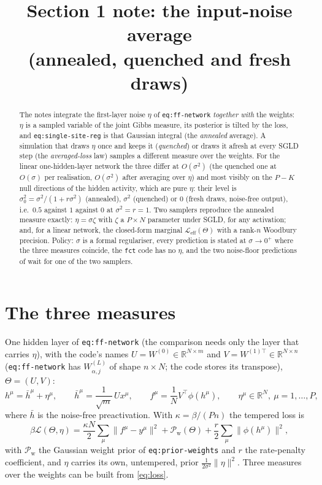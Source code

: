 \documentclass[11pt,a4paper]{article}
\title{Section 1 note: the input-noise average\\(annealed, quenched and fresh draws)}
\author{}
\date{}
\newcommand{\R}{\mathbb R}
\newcommand{\Lc}{\mathcal L}
\newcommand{\Leff}{\mathcal L_{\mathrm{eff}}}
\newcommand{\Pw}{\mathcal P_{\mathrm w}}
\newcommand{\hb}{\bar h}
\theoremstyle{remark}
\begin{document}
\maketitle

\begin{abstract}
The notes integrate the first-layer noise $\eta$ of \texttt{eq:ff-network}
\emph{together with} the weights: $\eta$ is a sampled variable of the joint
Gibbs measure, its posterior is tilted by the loss, and
\texttt{eq:single-site-reg} is that Gaussian integral (the \emph{annealed}
average). A simulation that draws $\eta$ once and keeps it (\emph{quenched}) or
draws it afresh at every SGLD step (the \emph{averaged-loss} law) samples a
different measure over the weights. For the linear one-hidden-layer network
the three differ at $O(\sigma^2)$ (the quenched one at $O(\sigma)$ per
realisation, $O(\sigma^2)$ after averaging over $\eta$) and most visibly on the $P-K$ null
directions of the hidden activity, which are pure $\eta$: their level is
$\sigma_0^2 = \sigma^2/(1+r\sigma^2)$ (annealed), $\sigma^2$ (quenched) or $0$
(fresh draws, noise-free output), i.e.\ $0.5$ against $1$ against $0$ at
$\sigma^2 = r = 1$. Two samplers reproduce the annealed measure exactly:
$\eta = \sigma\zeta$ with $\zeta$ a $P\times N$ parameter under SGLD, for any
activation; and, for a linear network, the closed-form marginal
$\Leff(\Theta)$ with a rank-$n$ Woodbury precision. Policy: $\sigma$ is a
formal regulariser, every prediction is stated at $\sigma\to0^+$ where the
three measures coincide, the \texttt{fct} code has no $\eta$, and the two
noise-floor predictions of  wait for one of
the two samplers.
\end{abstract}

\section{The three measures}
\label{sec:measures}

One hidden layer of \texttt{eq:ff-network} (the comparison needs only the
layer that carries $\eta$), with the code's names $U = W^{(0)}\in\R^{N\times m}$
and $V = W^{(1)\top}\in\R^{N\times n}$ (\texttt{eq:ff-network} has
$W^{(L)}_{\alpha,j}$ of shape $n\times N$; the code stores its transpose),
$\Theta = (U,V)$:
\begin{equation}
  h^\mu = \hb^\mu + \eta^\mu,\qquad
  \hb^\mu = \frac{1}{\sqrt m}\,U x^\mu,\qquad
  f^\mu = \frac1N V^\top\phi(h^\mu),\qquad
  \eta^\mu\in\R^N,\ \mu = 1,\dots,P,
  \label{eq:net}
\end{equation}
where $\hb$ is the noise-free preactivation. With $\kappa = \beta/(Pn)$ the
tempered loss is
\begin{equation}
  \beta\Lc(\Theta,\eta)
  = \frac{\kappa N}{2}\sum_\mu\|f^\mu - y^\mu\|^2
  + \Pw(\Theta)
  + \frac r2\sum_\mu\|\phi(h^\mu)\|^2 ,
  \label{eq:loss}
\end{equation}
with $\Pw$ the Gaussian weight prior of \texttt{eq:prior-weights} and $r$ the
rate-penalty coefficient, and $\eta$ carries its own, untempered,
prior $\frac{1}{2\sigma^2}\|\eta\|^2$. Three measures over the weights can be
built from \eqref{eq:loss}.
\end{document}
